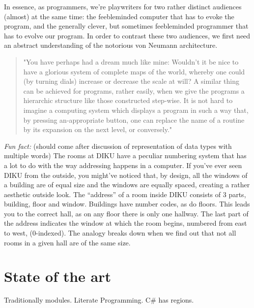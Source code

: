 In essence, as programmers, we're playwriters for two rather distinct audiences
(almost) at the same time: the feebleminded computer that has to evoke the
program, and the generally clever, but sometimes feebleminded programmer that
has to evolve our program. In order to contrast these two audiences, we first
need an abstract understanding of the notorious von Neumann architecture.







\begin{quote}"You have perhaps had a dream much like mine: Wouldn't it be nice
to have a glorious system of complete maps of the world, whereby one could (by
turning dials) increase or decrease the scale at will? A similar thing can be
achieved for programs, rather easily, when we give the programs a hierarchic
structure like those constructed step-wise. It is not hard to imagine a
computing system which displays a program in such a way that, by pressing
an-appropriate button, one can replace the name of a routine by its expansion
on the next level, or conversely."\cite{knuth-review-of-sp}\end{quote}

\emph{Fun fact:} (should come after discussion of representation of data types
with multiple words) The rooms at DIKU have a peculiar numbering system that
has a lot to do with the way addressing happens in a computer. If you've ever
seen DIKU from the outside, you might've noticed that, by design, all the
windows of a building are of equal size and the windows are equally spaced,
creating a rather aesthetic outside look. The ``address'' of a room inside DIKU
consists of 3 parts, building, floor and window. Buildings have number codes,
as do floors. This leads you to the correct hall, as on any floor there is only
one hallway. The last part of the address indicates the window at which the
room begins, numbered from east to west, (0-indexed). The analogy breaks down
when we find out that not all rooms in a given hall are of the same size.



\section{State of the art}

Traditionally modules. Literate Programming. C\# has regions.


